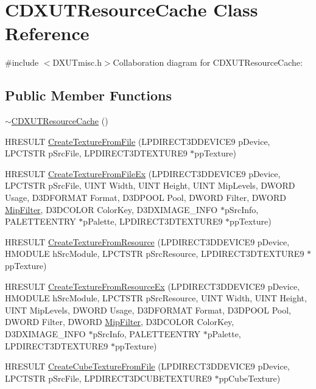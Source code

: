 \hypertarget{class_c_d_x_u_t_resource_cache}{
\section{CDXUTResourceCache Class Reference}
\label{class_c_d_x_u_t_resource_cache}
}


{\ttfamily \#include $<$DXUTmisc.h$>$}Collaboration diagram for CDXUTResourceCache:\subsection*{Public Member Functions}
\begin{DoxyCompactItemize}
\item 
\hyperlink{class_c_d_x_u_t_resource_cache_a1986d13c2bac18a41178e446917e1d64}{$\sim$CDXUTResourceCache} ()
\item 
HRESULT \hyperlink{class_c_d_x_u_t_resource_cache_a682c9c2045cc661670d98412deb5f4ef}{CreateTextureFromFile} (LPDIRECT3DDEVICE9 pDevice, LPCTSTR pSrcFile, LPDIRECT3DTEXTURE9 $\ast$ppTexture)
\item 
HRESULT \hyperlink{class_c_d_x_u_t_resource_cache_a4f33257885010dd13d4e996e9d3d2d3e}{CreateTextureFromFileEx} (LPDIRECT3DDEVICE9 pDevice, LPCTSTR pSrcFile, UINT Width, UINT Height, UINT MipLevels, DWORD Usage, D3DFORMAT Format, D3DPOOL Pool, DWORD Filter, DWORD \hyperlink{shader_8fx_8c_a2d427a0f2ae0e99d2d700cf27d0417aa}{MipFilter}, D3DCOLOR ColorKey, D3DXIMAGE\_\-INFO $\ast$pSrcInfo, PALETTEENTRY $\ast$pPalette, LPDIRECT3DTEXTURE9 $\ast$ppTexture)
\item 
HRESULT \hyperlink{class_c_d_x_u_t_resource_cache_ac2289531afd466288f7b35b2aa2a8ab1}{CreateTextureFromResource} (LPDIRECT3DDEVICE9 pDevice, HMODULE hSrcModule, LPCTSTR pSrcResource, LPDIRECT3DTEXTURE9 $\ast$ppTexture)
\item 
HRESULT \hyperlink{class_c_d_x_u_t_resource_cache_a0da1d5be9bcc2332a63b6a9f3dac24c6}{CreateTextureFromResourceEx} (LPDIRECT3DDEVICE9 pDevice, HMODULE hSrcModule, LPCTSTR pSrcResource, UINT Width, UINT Height, UINT MipLevels, DWORD Usage, D3DFORMAT Format, D3DPOOL Pool, DWORD Filter, DWORD \hyperlink{shader_8fx_8c_a2d427a0f2ae0e99d2d700cf27d0417aa}{MipFilter}, D3DCOLOR ColorKey, D3DXIMAGE\_\-INFO $\ast$pSrcInfo, PALETTEENTRY $\ast$pPalette, LPDIRECT3DTEXTURE9 $\ast$ppTexture)
\item 
HRESULT \hyperlink{class_c_d_x_u_t_resource_cache_ac81b19e2dfca7f4ef542425007b6cfc8}{CreateCubeTextureFromFile} (LPDIRECT3DDEVICE9 pDevice, LPCTSTR pSrcFile, LPDIRECT3DCUBETEXTURE9 $\ast$ppCubeTexture)

\end{DoxyCompactItemize}

